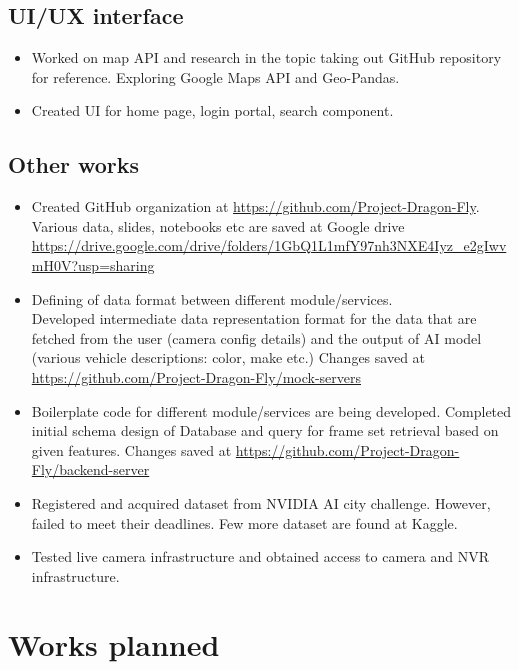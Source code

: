 \documentclass{reportFormat}
\begin{document}
	\subsection*{UI/UX interface}
	\begin{itemize}
		\item Worked on map API and research in the topic taking out GitHub repository for reference. Exploring Google Maps API and Geo-Pandas.
		\item Created UI for home page, login portal, search component. 

	\end{itemize}
	
	\subsection*{Other works}
	\begin{itemize}
		\item Created GitHub organization at \url{https://github.com/Project-Dragon-Fly}. Various data, slides, notebooks etc are saved at Google drive \url{https://drive.google.com/drive/folders/1GbQ1L1mfY97nh3NXE4Iyz\_e2gIwvmH0V?usp=sharing}
		\item Defining of data format between different module/services. \\
		Developed intermediate data representation format for the data that are fetched from the user (camera config details) and the output of AI model (various vehicle descriptions: color, make etc.) Changes saved at \url{https://github.com/Project-Dragon-Fly/mock-servers}
		
		\item Boilerplate code for different module/services are being developed. Completed initial schema design of Database and query for frame set retrieval based on given features. Changes saved at \url{https://github.com/Project-Dragon-Fly/backend-server}
		
		\item Registered and acquired dataset from NVIDIA AI city challenge. However, failed to meet their deadlines. Few more dataset are found at Kaggle.
		
		\item Tested live camera infrastructure and obtained access to camera and NVR infrastructure. 

	\end{itemize}
	
	\newpage
	
	\section*{Works planned}
\end{document}
